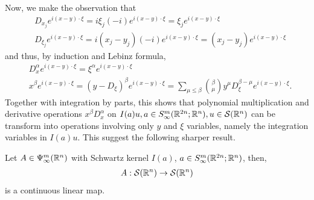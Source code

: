 \documentclass[12pt]{article}
\begin{document}
Now, we make the observation that
\begin{align*}
&D_{x_j} e^{i (x - y) \cdot \xi} = i \xi_{j} (-i) e^{i (x - y) \cdot \xi} = \xi_j e^{i (x - y) \cdot \xi}\\
& D_{\xi_j} e^{i (x - y) \cdot \xi} = i (x_j - y_j) (-i) e^{i (x - y) \cdot \xi} = (x_j - y_j) e^{i (x - y) \cdot \xi} 
\end{align*}
and thus, by induction and Lebinz formula, 
\begin{align*}
&D^\alpha_x e^{i (x - y) \cdot \xi} = \xi^\alpha e^{i (x - y) \cdot \xi} \\
& x^\beta e^{i (x - y) \cdot \xi} = (y - D_\xi)^\beta e^{i (x - y) \cdot \xi} = \sum_{\mu \leq \beta} \binom{\beta}{\mu} y^\mu D^{\beta - \mu}_\xi e^{i (x - y) \cdot \xi}. 
\end{align*}
Together with integration by parts, this shows that polynomial multiplication and derivative operations $x^\beta D^\alpha_x$ on $I(a)u, a \in S^{m}_{\infty}({\mathbb R}^{2n}; {\mathbb R}^{n}), u \in \mathcal{S}({\mathbb R}^n)$ can be transform into operations involving only $y$ and $\xi$ variables, namely the integration variables in $I(a)u$. This suggest the following sharper result. 
\begin{fprop}
    Let $A \in \Psi^{m}_{\infty}({\mathbb R}^n)$ with Schwartz kernel $I(a)$, $a \in S^{m}_{\infty}({\mathbb R}^{2n}; {\mathbb R}^{n})$, then, 
    \begin{align*}
    A : \mathcal{S}({\mathbb R}^n) \to \mathcal{S}({\mathbb R}^n)
    \end{align*}
    is a continuous linear map. 
\end{fprop}
\end{document}
